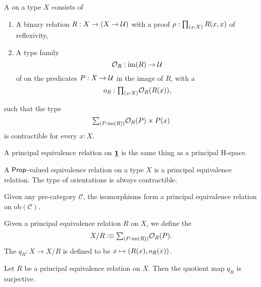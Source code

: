 \begin{defn}
A  on a type $X$ consists of
\begin{enumerate}
\item A binary relation $R:X\to (X\to \mathcal{U})$ with a proof $\rho:\prd{x:X}R(x,x)$ of reflexivity,
\item A type family
\begin{equation*}
\mathcal{O}_R : \operatorname{im}(R)\to\mathcal{U} \\
\end{equation*}
of  on the predicates $P:X\to \mathcal{U}$ in the image of $R$, with a 
\begin{equation*}
o_R : \prd{x:X}\mathcal{O}_R(R(x)),
\end{equation*}
\end{enumerate}
such that the type
\begin{equation*}
\sm{P:\im(R)}\mathcal{O}_R(P)\times P(x)
\end{equation*}
is contractible for every $x:X$. 
\end{defn}

\begin{eg}
A principal equivalence relation on $\underline{\mathbf{1}}$ is the same thing as a principal H-space.
\end{eg}

\begin{eg}
A $\mathsf{Prop}$-valued equivalence relation on a type $X$ is a principal equivalence relation. The type of orientations is always contractible.
\end{eg}

\begin{eg}
Given any pre-category $\mathcal{C}$, the isomorphisms form a principal equivalence relation on $\mathrm{ob}(\mathcal{C})$. 
\end{eg}

\begin{defn}
Given a principal equivalence relation $R$ on $X$, we define the  
\begin{equation*}
X/R\defeq\sm{P:\im(R)}\mathcal{O}_R(P).
\end{equation*}
The  $q_R:X\to X/R$ is defined to be $x\mapsto{\mathopen{}(R(x),o_R(x))\mathclose{}}$. 
\end{defn}

\begin{lem}
Let $R$ be a principal equivalence relation on $X$. Then the quotient map $q_R$ is surjective.
\end{lem}

